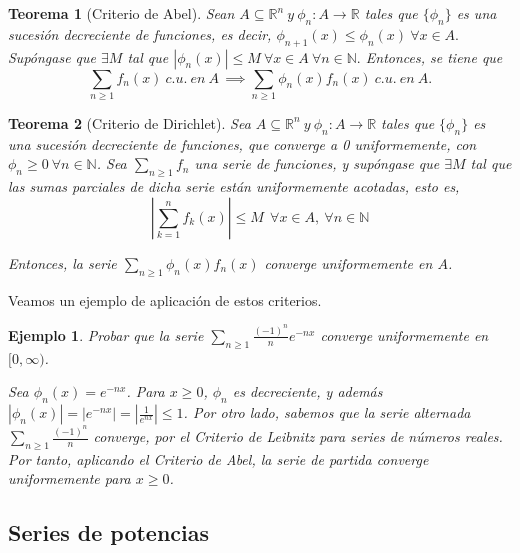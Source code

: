 \documentclass[11pt, a4paper]{article}
\theoremstyle{theorem-style}
\newtheorem{nth}{Teorema}[section]
\theoremstyle{definition-style}
\theoremstyle{remark-style}
\theoremstyle{example-style}
\newtheorem{ejemplo}{Ejemplo}[section]
\begin{document}
\begin{nth}[Criterio de Abel] \label{11} Sean $ A \subseteq \mathbb{R}^n\  y \ \phi_n : A \rightarrow \mathbb{R}$ tales que $\{\phi_n\}$ es una sucesión decreciente de funciones, es decir, $\phi_{n+1}(x) \leq \phi_n (x)\ \forall x \in A.$ Supóngase que $\exists M$ tal que $|\phi_n (x)| \leq M\ \forall x \in A\ \forall n \in \mathbb{N}.$ Entonces, se tiene que
$$\sum_{n \ge 1} f_n(x)\ c. u.\ en\ A\, \implies \sum_{n \ge 1} \phi_n(x) f_n(x)\ c. u.\ en\ A.$$
\end{nth}

\begin{nth}[Criterio de Dirichlet] \label{12} Sea $A \subseteq \mathbb{R}^n\  y \ \phi_n : A \rightarrow \mathbb{R}$ tales que $\{\phi_n\}$ es una sucesión decreciente de funciones, que converge a 0 uniformemente, con $\phi_n \ge 0 \ \forall n \in \mathbb{N}$. Sea $\sum_{n \ge 1} f_n$ una serie de funciones, y supóngase que $\exists M$ tal que las sumas parciales de dicha serie están uniformemente acotadas, esto es, $$\left| \sum_{k=1}^n f_k(x) \right| \le M \ \ \forall x \in A, \ \forall n \in \mathbb{N}$$ 

Entonces, la serie $\displaystyle \sum_{n\ge 1} \phi_n(x)f_n(x)$ converge uniformemente en $A$.
	
\end{nth}

Veamos un ejemplo de aplicación de estos criterios.

\begin{ejemplo}
	Probar que la serie $\displaystyle \sum_{n \ge 1} \frac{(-1)^n}{n} e^{-nx}$ converge uniformemente en $[0, \infty)$.
	
Sea $\phi_n(x) = e^{-nx}$. Para $x \ge 0$, $\phi_n$ es decreciente, y además $|\phi_n(x)| = | e^{-nx} |  = |\frac{1}{e^{nx}} |\le 1$. Por otro lado, sabemos que la serie alternada $ \sum_{n \ge 1} \frac{(-1)^n}{n}$ converge, por el \textit{Criterio de Leibnitz} para series de números reales. Por tanto, aplicando el \textit{Criterio de Abel}, la serie de partida converge uniformemente para $x \ge 0$.  
\end{ejemplo}



\subsection{Series de potencias}
\end{document}
